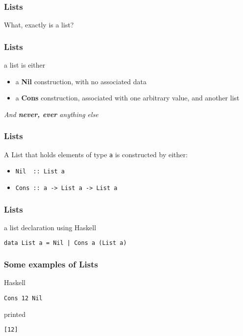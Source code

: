 \begin{frame}
\frametitle{Lists}
\begin{center}
What, exactly is a list?
\end{center}
\end{frame}

\begin{frame}
\frametitle{Lists}
\begin{block}{a list is either}
\begin{itemize}
\item a \textbf{Nil} construction, with no associated data
\item a \textbf{Cons} construction, associated with one arbitrary value, and another list
\end{itemize}
\end{block}
\emph{And \textbf{never, ever} anything else}
\end{frame}

\begin{frame}
\frametitle{Lists}
\begin{block}{A List that holds elements of type \lstinline{a} is constructed by either:}
\begin{itemize}
\item \lstinline{Nil  :: List a}
\item \lstinline{Cons :: a -> List a -> List a}
\end{itemize}
\end{block}
\end{frame}

\begin{frame}[fragile]
\frametitle{Lists}
\begin{block}{a list declaration using Haskell}
\begin{lstlisting}[style=haskell,basicstyle=\scriptsize\ttfamily,mathescape]
data List a = Nil | Cons a (List a)
\end{lstlisting}
\end{block}
\end{frame}

\begin{frame}[fragile]
\frametitle{Some examples of Lists}
\begin{block}{Haskell}
\begin{lstlisting}[style=haskell,basicstyle=\scriptsize\ttfamily,mathescape]
Cons 12 Nil
\end{lstlisting}
\end{block}
\begin{block}{printed}
\begin{lstlisting}[style=haskell,basicstyle=\scriptsize\ttfamily,mathescape]
[12]
\end{lstlisting}
\end{block}
\end{frame}


